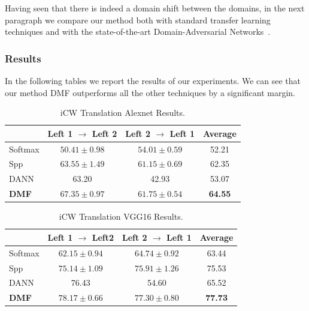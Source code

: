 \documentclass[../main.tex]{subfiles}
\begin{document}
	Having seen that there is indeed a domain shift between the domains, in the next paragraph we compare our method both with
	standard transfer learning techniques and with the state-of-the-art Domain-Adversarial Networks~\cite{DANN}.

    \subsubsection{Results}\label{subsubsec:results}
	In the following tables we report the results of our experiments. We can see that our method DMF outperforms
	all the other techniques by a significant margin.
    \newline

    \begin{table}[!ht]
        \centering{}
        \begin{tabular}{l c c c}
            \toprule
                     & Left 1 $\rightarrow$ Left 2 & Left 2 $\rightarrow$ Left 1 & Average \\
            \midrule
            Softmax  & $50.41 \pm{} 0.98$ & $54.01 \pm{} 0.59$ & 52.21 \\
            Spp      & $63.55 \pm{} 1.49$ & $61.15 \pm{} 0.69$ & 62.35 \\
            DANN     &  63.20             &  42.93             & 53.07 \\
        \textbf{DMF} & $\mathbf{67.35 \pm{} 0.97}$ & $\mathbf{61.75 \pm{} 0.54}$ & \textbf{64.55} \\
            \bottomrule
        \end{tabular}
        \caption{iCW Translation Alexnet Results.}
    \end{table}

    \begin{table}[!ht]
        \centering{}
        \begin{tabular}{l c c c}
            \toprule
                     & Left 1 $\rightarrow$ Left2 & Left 2 $\rightarrow$ Left 1 & Average \\
            \midrule
            Softmax  & $62.15 \pm{} 0.94$ & $64.74 \pm{} 0.92$ & 63.44 \\
            Spp      & $75.14 \pm{} 1.09$ & $75.91 \pm{} 1.26$ & 75.53 \\
            DANN     &  76.43             &  54.60             & 65.52 \\
        \textbf{DMF} & $\mathbf{78.17 \pm{} 0.66}$ & $\mathbf{77.30 \pm{} 0.80}$ & \textbf{77.73} \\
            \bottomrule
        \end{tabular}
        \caption{iCW Translation VGG16 Results.}
    \end{table}
\end{document}
